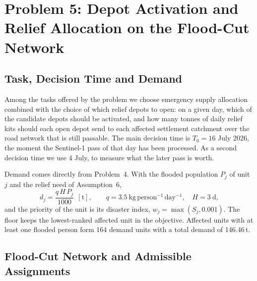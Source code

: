 \section[Problem 5]{Problem 5: Depot Activation and Relief Allocation on the Flood-Cut Network}
\label{sec:q5}

\subsection{Task, Decision Time and Demand}

Among the tasks offered by the problem we choose emergency supply allocation combined with the choice of which relief depots to open: on a given day, which of the candidate depots should be activated, and how many tonnes of daily relief kits should each open depot send to each affected settlement catchment over the road network that is still passable. The main decision time is $T_0=16$ July 2026, the moment the Sentinel-1 pass of that day has been processed. As a second decision time we use 4 July, to measure what the later pass is worth.

Demand comes directly from Problem~4. With the flooded population $P_j$ of unit $j$ and the relief need of Assumption~6,
\begin{equation}
d_j=\frac{q\,H\,P_j}{1000}\ \ [\mathrm t],\qquad q=3.5\ \mathrm{kg\,person^{-1}\,day^{-1}},\quad H=3\ \mathrm d,
\label{eq:demand}
\end{equation}
and the priority of the unit is its disaster index, $w_j=\max(S_j,0.001)$. The floor keeps the lowest-ranked affected unit in the objective. Affected units with at least one flooded person form 164 demand units with a total demand of 146.46\,t.

\subsection{Flood-Cut Network and Admissible Assignments}

